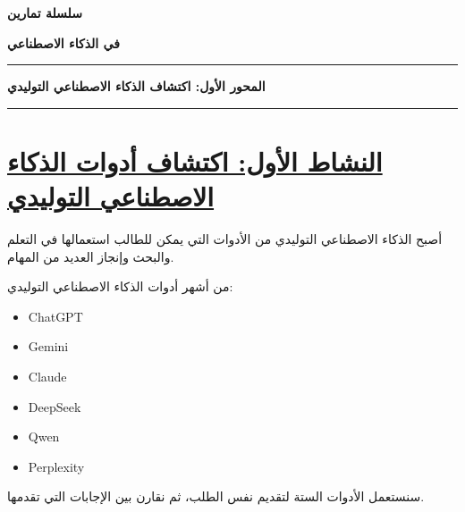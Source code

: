 \documentclass[a4paper]{article}
\begin{document}

\begin{center}

{\Large\khatt\textbf{سلسلة تمارين}}

\vspace{0.2cm}

{\Large\khatt\textbf{في الذكاء الاصطناعي }}

\end{center}

\rule{\textwidth}{1pt}

\begin{center}

{\khatt\textbf{المحور الأول: اكتشاف الذكاء الاصطناعي التوليدي}}


\end{center}

\rule{\textwidth}{1pt}



\section*{\khatt\underline{النشاط الأول: اكتشاف أدوات الذكاء الاصطناعي التوليدي}}

أصبح الذكاء الاصطناعي التوليدي من الأدوات التي يمكن للطالب
استعمالها في التعلم والبحث وإنجاز العديد من المهام.

من أشهر أدوات الذكاء الاصطناعي التوليدي:

\begin{itemize}

    \item \textenglish{ChatGPT}

    \item \textenglish{Gemini}

    \item \textenglish{Claude}

    \item \textenglish{DeepSeek}

    \item \textenglish{Qwen}

    \item \textenglish{Perplexity}

\end{itemize}

سنستعمل الأدوات الستة لتقديم نفس الطلب، ثم نقارن بين
الإجابات التي تقدمها.
\end{document}
